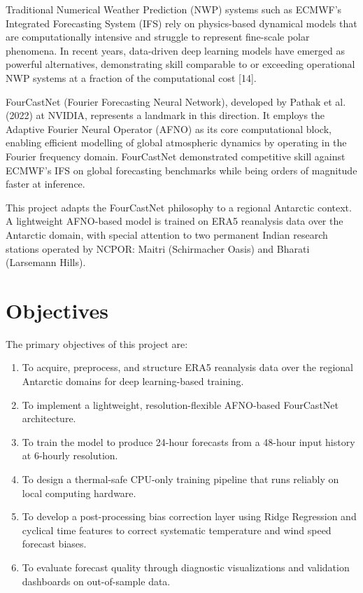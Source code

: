\documentclass[12pt,titlepage,a4paper]{report}
\begin{document}
Traditional Numerical Weather Prediction (NWP) systems such as ECMWF's Integrated Forecasting System (IFS) rely on physics-based dynamical models that are computationally intensive and struggle to represent fine-scale polar phenomena. In recent years, data-driven deep learning models have emerged as powerful alternatives, demonstrating skill comparable to or exceeding operational NWP systems at a fraction of the computational cost [14].

FourCastNet (Fourier Forecasting Neural Network), developed by Pathak et al. (2022) at NVIDIA, represents a landmark in this direction. It employs the Adaptive Fourier Neural Operator (AFNO) as its core computational block, enabling efficient modelling of global atmospheric dynamics by operating in the Fourier frequency domain. FourCastNet demonstrated competitive skill against ECMWF's IFS on global forecasting benchmarks while being orders of magnitude faster at inference.

This project adapts the FourCastNet philosophy to a regional Antarctic context. A lightweight AFNO-based model is trained on ERA5 reanalysis data over the Antarctic domain, with special attention to two permanent Indian research stations operated by NCPOR: Maitri (Schirmacher Oasis) and Bharati (Larsemann Hills).

\section{Objectives}
The primary objectives of this project are:
\begin{enumerate}
    \item To acquire, preprocess, and structure ERA5 reanalysis data over the regional Antarctic domains for deep learning-based training.
    \item To implement a lightweight, resolution-flexible AFNO-based FourCastNet architecture.
    \item To train the model to produce 24-hour forecasts from a 48-hour input history at 6-hourly resolution.
    \item To design a thermal-safe CPU-only training pipeline that runs reliably on local computing hardware.
    \item To develop a post-processing bias correction layer using Ridge Regression and cyclical time features to correct systematic temperature and wind speed forecast biases.
    \item To evaluate forecast quality through diagnostic visualizations and validation dashboards on out-of-sample data.
\end{enumerate}
\end{document}

